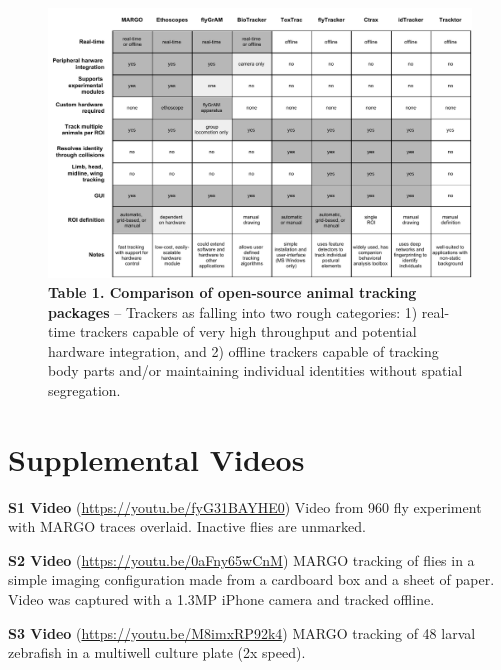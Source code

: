 \documentclass[10pt,letterpaper]{article}
\begin{document}
\clearpage
\begin{figure}
	\includegraphics[width=\linewidth]{../../figures/platform_comparison_draft.pdf}
	\caption*{\footnotesize \textbf{Table 1. Comparison of open-source animal tracking packages} -- Trackers as falling into two rough categories: 1) real-time trackers capable of very high throughput and potential hardware integration, and 2) offline trackers capable of tracking body parts and/or maintaining individual identities without spatial segregation.}
\end{figure}

\clearpage
\section*{Supplemental Videos}

\newline
\noindent
\textbf{S1 Video} (\href{https://youtu.be/fyG31BAYHE0}{\color{blue}https://youtu.be/fyG31BAYHE0}) Video from 960 fly experiment with MARGO traces overlaid. Inactive flies are unmarked.
\newline

\noindent
\textbf{S2 Video} (\href{https://youtu.be/0aFny65wCnM}{\color{blue}https://youtu.be/0aFny65wCnM}) MARGO tracking of flies in a simple imaging configuration made from a cardboard box and a sheet of paper. Video was captured with a 1.3MP iPhone camera and tracked offline.
\newline

\noindent
\textbf{S3 Video} (\href{https://youtu.be/M8imxRP92k4}{\color{blue}https://youtu.be/M8imxRP92k4}) MARGO tracking of 48 larval zebrafish in a multiwell culture plate (2x speed).
\newline
\end{document}
